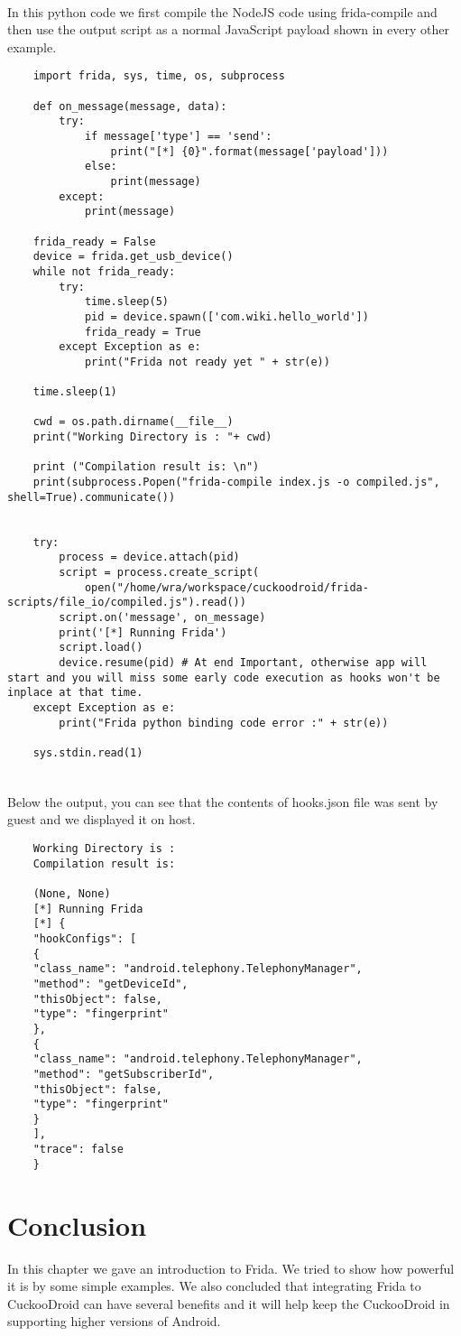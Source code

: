 \documentclass[../main.tex]{subfile}
\begin{document}
	\paragraph{} In this python code we first compile the NodeJS code using frida-compile and then use the output script as a normal JavaScript payload shown in every other example.
	\begin{lstlisting}
	import frida, sys, time, os, subprocess
	
	def on_message(message, data):
		try:
			if message['type'] == 'send':
				print("[*] {0}".format(message['payload']))
			else:
				print(message)
		except:
			print(message)
		
	frida_ready = False
	device = frida.get_usb_device()
	while not frida_ready:
		try:
			time.sleep(5)
			pid = device.spawn(['com.wiki.hello_world'])
			frida_ready = True
		except Exception as e:
			print("Frida not ready yet " + str(e))
	
	time.sleep(1)
	
	cwd = os.path.dirname(__file__)
	print("Working Directory is : "+ cwd)
	
	print ("Compilation result is: \n")
	print(subprocess.Popen("frida-compile index.js -o compiled.js", shell=True).communicate())
	
	
	try:
		process = device.attach(pid)
		script = process.create_script(
			open("/home/wra/workspace/cuckoodroid/frida-scripts/file_io/compiled.js").read())
		script.on('message', on_message)
		print('[*] Running Frida')
		script.load()
		device.resume(pid) # At end Important, otherwise app will start and you will miss some early code execution as hooks won't be inplace at that time.
	except Exception as e:
		print("Frida python binding code error :" + str(e))
	
	sys.stdin.read(1)
	
	\end{lstlisting}

	\paragraph{} Below the output, you can see that the contents of hooks.json file was sent by guest and we displayed it on host.
	\begin{lstlisting}
	Working Directory is : 
	Compilation result is: 
	
	(None, None)
	[*] Running Frida
	[*] {
	"hookConfigs": [
	{
	"class_name": "android.telephony.TelephonyManager", 
	"method": "getDeviceId", 
	"thisObject": false, 
	"type": "fingerprint" 
	}, 
	{
	"class_name": "android.telephony.TelephonyManager", 
	"method": "getSubscriberId", 
	"thisObject": false, 
	"type": "fingerprint" 
	}
	], 
	"trace": false
	}
	\end{lstlisting}
	
	\section{Conclusion} In this chapter we gave an introduction to Frida. We tried to show how powerful it is by some simple examples. We also concluded that integrating Frida to CuckooDroid can have several benefits and it will help keep the CuckooDroid in supporting higher versions of Android. 
\end{document}
